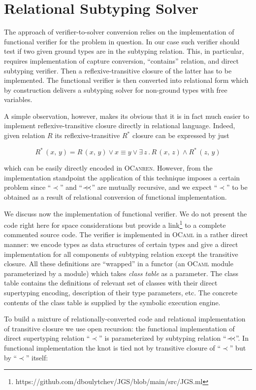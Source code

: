 \section{Relational Subtyping Solver}
\label{sec:solver}

The approach of verifier-to-solver conversion relies on the implementation of functional verifier for the problem in question. In our
case such verifier should test if two given ground types are in the subtyping relation. This, in particular, requires implementation
of capture conversion, ``contains'' relation, and direct subtyping verifier. Then a reflexive-transitive closure of the latter has to
be implemented. The functional verifier is then converted into relational form which by construction delivers a subtyping solver for
non-ground types with free variables.

A simple observation, however, makes its obvious that it is in fact much easier to implement reflexive-transitive closure directly
in relational language. Indeed, given relation $R$ its reflexive-transitive $R^*$ closure can be expressed by just

\[
R^*\,(x,\, y) = R\, (x,\, y)\vee x\equiv y\vee\exists\, z\,.\,R\,(x,\,z)\wedge R^*\,(z,\,y)
\]

which can be easily directly encoded in \textsc{OCanren}. However, from the implementation standpoint the application of this technique
imposes a certain problem since ``$\prec$'' and ``$\prec\mathrel{\mkern-5mu}\prec$'' are mutually recursive, and we expect ``$\prec$'' to be obtained as a
result of relational conversion of functional implementation.

We discuss now the implementation of functional verifier. We do not present the code right here for space considerations but provide
a link\footnote{https://github.com/dboulytchev/JGS/blob/main/src/JGS.ml} to a complete commented source code. The verifier is
implemented in \textsc{OCaml} in a rather direct manner: we encode types as data structures of certain types and give a
direct implementation for all components of subtyping relation except the transitive closure. All these definitions are ``wrapped'' in a
functor (an \textsc{OCaml} module parameterized by a module) which takes \emph{class table} as a parameter. The class table
contains the definitions of relevant set of classes with their direct supertyping encoding, description of their type parameters, etc.
The concrete contents of the class table is supplied by the symbolic execution engine.

To build a mixture of relationally-converted code and relational implementation of transitive closure we use open recursion: the functional
implementation of direct supertyping relation ``$\prec$'' is parameterized by subtyping relation  ``$\prec\mathrel{\mkern-5mu}\prec$''. In functional implementation
the knot is tied not by transitive closure of ``$\prec$'' but by ``$\prec$'' itself:

